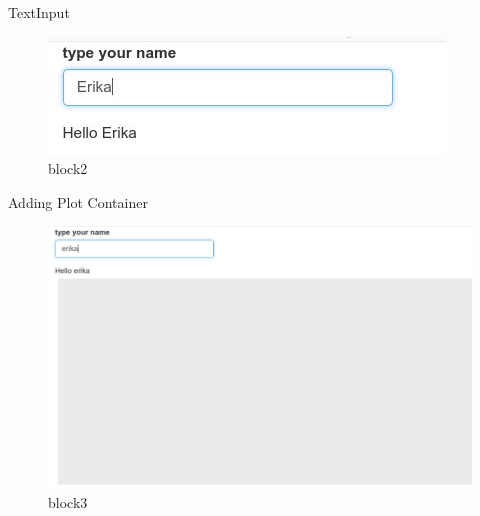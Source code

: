 \documentclass[
  ignorenonframetext,
]{beamer}
\begin{document}
\begin{frame}{TextInput}
\protect\hypertarget{textinput}{}

\begin{figure}
\centering
\includegraphics{images/textInput.jpg}
\caption{block2}
\end{figure}

\end{frame}

\begin{frame}{Adding Plot Container}
\protect\hypertarget{adding-plot-container}{}

\begin{figure}
\centering
\includegraphics{images/plotContainer.jpg}
\caption{block3}
\end{figure}

\end{frame}
\end{document}

